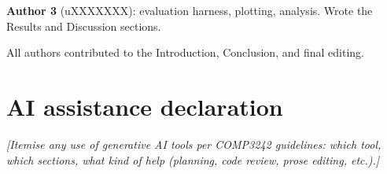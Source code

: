 \documentclass[10pt,a4paper]{article}
\begin{document}
\textbf{Author 3} (uXXXXXXX): evaluation harness, plotting, analysis.
Wrote the Results and Discussion sections.

All authors contributed to the Introduction, Conclusion, and final editing.

\section*{AI assistance declaration}

\textit{[Itemise any use of generative AI tools per COMP3242 guidelines:
which tool, which sections, what kind of help (planning, code review,
prose editing, etc.).]}



\end{document}
